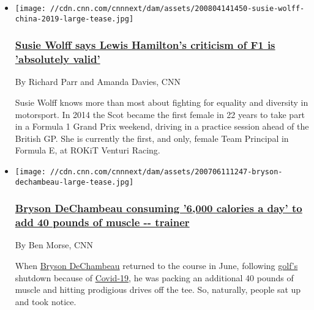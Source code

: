 \begin{itemize}
\item
  \href{/2020/08/04/sport/susie-wolff-formula-e-return-spt-intl-cmd/index.html}{}

  \texttt{[image: //cdn.cnn.com/cnnnext/dam/assets/200804141450-susie-wolff-china-2019-large-tease.jpg]}

  \hypertarget{susie-wolff-says-lewis-hamiltons-criticism-of-f1-is-absolutely-valid}{%
  \subsubsection{\texorpdfstring{\href{/2020/08/04/sport/susie-wolff-formula-e-return-spt-intl-cmd/index.html}{Susie
  Wolff says Lewis Hamilton's criticism of F1 is 'absolutely
  valid'}}{Susie Wolff says Lewis Hamilton's criticism of F1 is 'absolutely valid'}}\label{susie-wolff-says-lewis-hamiltons-criticism-of-f1-is-absolutely-valid}}

  By Richard Parr and Amanda Davies, CNN

  Susie Wolff knows more than most about fighting for equality and
  diversity in motorsport. In 2014 the Scot became the first female in
  22 years to take part in a Formula 1 Grand Prix weekend, driving in a
  practice session ahead of the British GP. She is currently the first,
  and only, female Team Principal in Formula E, at ROKiT Venturi Racing.
\end{itemize}

\begin{itemize}
\item
  \href{/2020/08/06/golf/bryson-dechambeau-calorie-trainer-bulking-muscle-golf-spt-intl/index.html}{}

  \texttt{[image: //cdn.cnn.com/cnnnext/dam/assets/200706111247-bryson-dechambeau-large-tease.jpg]}

  \hypertarget{bryson-dechambeau-consuming-6000-calories-a-day-to-add-40-pounds-of-muscle----trainer-1}{%
  \subsubsection{\texorpdfstring{\href{/2020/08/06/golf/bryson-dechambeau-calorie-trainer-bulking-muscle-golf-spt-intl/index.html}{Bryson
  DeChambeau consuming '6,000 calories a day' to add 40 pounds of muscle
  -\/-
  trainer}}{Bryson DeChambeau consuming '6,000 calories a day' to add 40 pounds of muscle -\/- trainer}}\label{bryson-dechambeau-consuming-6000-calories-a-day-to-add-40-pounds-of-muscle----trainer-1}}

  By Ben Morse, CNN

  When
  \href{https://www.cnn.com/2020/07/06/sport/bryson-dechambeau-rocket-mortgage-classic-pga-tour-golf-spt-intl/index.html}{Bryson
  DeChambeau} returned to the course in June, following
  \href{https://www.cnn.com/2020/08/05/golf/tiger-woods-pga-championship-golf-spt-intl/index.html}{golf's}
  shutdown because of
  \href{https://www.cnn.com/2020/07/30/golf/rory-mcilroy-europe-us-open-spt-intl/index.html}{Covid-19},
  he was packing an additional 40 pounds of muscle and hitting
  prodigious drives off the tee. So, naturally, people sat up and took
  notice.
\end{itemize}

